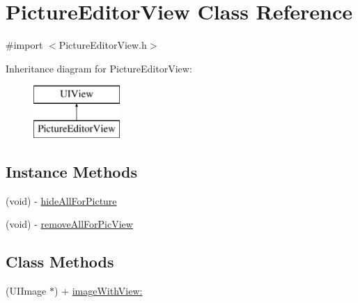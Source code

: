 \hypertarget{interface_picture_editor_view}{}\section{Picture\+Editor\+View Class Reference}
\label{interface_picture_editor_view}


{\ttfamily \#import $<$Picture\+Editor\+View.\+h$>$}

Inheritance diagram for Picture\+Editor\+View\+:\begin{figure}[H]
\begin{center}
\leavevmode
\includegraphics[height=2.000000cm]{interface_picture_editor_view}
\end{center}
\end{figure}
\subsection*{Instance Methods}
\begin{DoxyCompactItemize}
\item 
(void) -\/ \hyperlink{interface_picture_editor_view_ae1284a4d906171f56f93041bf07b02fb}{hide\+All\+For\+Picture}
\item 
(void) -\/ \hyperlink{interface_picture_editor_view_a2b2f1812795f418b325b47bf265c5f9f}{remove\+All\+For\+Pic\+View}
\end{DoxyCompactItemize}
\subsection*{Class Methods}
\begin{DoxyCompactItemize}
\item 
(U\+I\+Image $\ast$) + \hyperlink{interface_picture_editor_view_a538b91286f6528696320d2450704f78e}{image\+With\+View\+:}
\end{DoxyCompactItemize}
